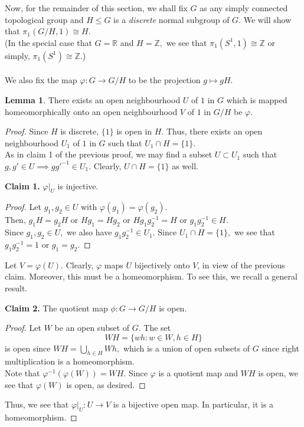 \documentclass[12pt]{article}
\theoremstyle{definition}
\numberwithin{thm}{section}
\newtheorem{lem}[thm]{Lemma}
\newenvironment{blockquote}
{\begin{mdframed}[skipabove=0pt, skipbelow=0pt, innertopmargin=4pt, innerbottommargin=4pt, bottomline=false,topline=false,rightline=false, linewidth=2pt]}
{\end{mdframed}}
\begin{document}
Now, for the remainder of this section, we shall fix $G$ as any simply connected topological group and $H \le G$ is a \emph{discrete} normal subgroup of $G.$ We will show that $\pi_1(G/H, 1) \cong H.$\\
(In the special case that $G = \mathbb{R}$ and $H = \mathbb{Z},$ we see that $\pi_1(S^1, 1) \cong \mathbb{Z}$ or simply, $\pi_1(S^1) \cong \mathbb{Z}.$)\\~\\
We also fix the map $\varphi:G \to G/H$ to be the projection $g \mapsto gH.$\\
\begin{lem} 
	There exists an open neighbourhood $U$ of $1$ in $G$ which is mapped homeomorphically onto an open neighbourhood $V$ of $1$ in $G/H$ be $\varphi.$
\end{lem}
\begin{proof} 
	Since $H$ is discrete, $\{1\}$ is open in $H.$ Thus, there exists an open neighbourhood $U_1$ of $1$ in $G$ such that $U_1 \cap H = \{1\}.$\\
	As in claim 1 of the previous proof, we may find a subset $U \subset U_1$ such that $g, g' \in U \implies gg'^{-1} \in U_1.$ Clearly, $U \cap H =\{1\}$ as well. \\
	\begin{blockquote}
		\textbf{Claim 1.} $\varphi|_U$ is injective.
	\begin{proof} 
		Let $g_1, g_2 \in U$ with $\varphi(g_1) = \varphi(g_2).$\\
		Then, $g_1H = g_2H$ or $Hg_1 = Hg_2$ or $Hg_1g_2^{-1} = H$ or $g_1g_2^{-1} \in H.$\\
		Since $g_1, g_2 \in U,$ we also have $g_1g_2^{-1} \in U_1.$ Since $U_1 \cap H = \{1\},$ we see that $g_1g_2^{-1} = 1$ or $g_1 = g_2.$
	\end{proof}
	\end{blockquote}
	Let $V = \varphi(U).$ Clearly, $\varphi$ maps $U$ bijectively onto $V$, in view of the previous claim. Moreover, this must be a homeomorphism. To see this, we recall a general result.
	\begin{blockquote}
		\textbf{Claim 2.} The quotient map $\phi:G \to G/H$ is open.
	\begin{proof} 
		Let $W$ be an open subset of $G.$ The set
		\begin{equation*} 
			WH = \{wh : w \in W, h \in H\}
		\end{equation*}
		is open since $WH = \displaystyle\bigcup_{h \in H}Wh,$ which is a union of open subsets of $G$ since right multiplication is a homeomorphism.\\
		Note that $\varphi^{-1}(\varphi(W)) = WH.$ Since $\varphi$ is a quotient map and $WH$ is open, we see that $\varphi(W)$ is open, as desired.
	\end{proof}
	\end{blockquote}
	Thus, we see that $\varphi|_U: U \to V$ is a bijective open map. In particular, it is a homeomorphism.
\end{proof}
\end{document}
